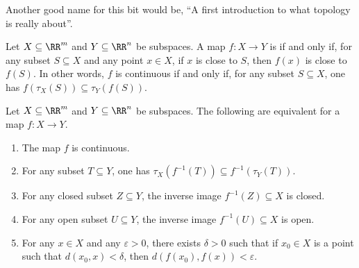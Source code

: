 
Another good name for this bit would be, \enquote{A first introduction to what topology is really about}.

\begin{dfn}
	Let $ X \subseteq \RR^m$ and $ Y \subseteq \RR^n $ be subspaces.
	A map $ f \colon X \to Y $ is  if and only if, for any subset $ S \subseteq X $ and any point $ x\in X$, if $ x $ is close to $S$, then $f(x) $ is close to $f(S)$.
	In other words, $f$ is continuous if and only if, for any subset $ S \subseteq X $, one has $f(\tau_X(S)) \subseteq \tau_Y(f(S))$.
\end{dfn}

\begin{prp}%
\label{prp:equivalent_characterizations_of_continuity}
	Let $ X \subseteq \RR^m$ and $ Y \subseteq \RR^n $ be subspaces.
	The following are equivalent for a map $ f \colon X \to Y $.
	\begin{enumerate}
		\item The map $ f $ is continuous.
		\item For any subset $ T \subseteq Y $, one has $\tau_X(f^{-1}(T)) \subseteq f^{-1}(\tau_Y(T))$.
		\item For any closed subset $ Z \subseteq Y $, the inverse image $ f^{-1}(Z) \subseteq X $ is closed.
		\item For any open subset $ U \subseteq Y $, the inverse image $ f^{-1}(U) \subseteq X $ is open.
		\item For any $ x \in X $ and any $\varepsilon > 0$, there exists $\delta >0$ such that if $x_0 \in X$ is a point such that $d(x_0,x) <\delta$, then%
			$ d(f(x_0), f(x)) < \varepsilon $.
	\end{enumerate}
\end{prp}


